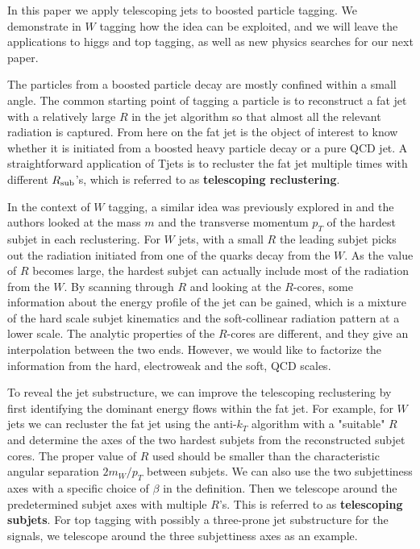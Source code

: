 \documentclass[aps,prl,floatfix,twocolumn,footinbib,amsmath,amssymb]{revtex4}
\begin{document}
In this paper we apply telescoping jets to boosted particle tagging. We demonstrate in $W$ tagging how the idea can be exploited, and we will leave the applications to higgs and top tagging, as well as new physics searches for our next paper.

The particles from a boosted particle decay are mostly confined within a small angle. The common starting point of tagging a particle is to reconstruct a fat jet with a relatively large $R$ in the jet algorithm so that almost all the relevant radiation is captured. From here on the fat jet is the object of interest to know whether it is initiated from a boosted heavy particle decay or a pure QCD jet. A straightforward application of Tjets is to recluster the fat jet multiple times with different $R_{\rm sub}$'s, which is referred to as {\bf telescoping reclustering}.

In the context of $W$ tagging, a similar idea was previously explored in \cite{Cui:2010km} and the authors looked at the mass $m$ and the transverse momentum $p_T$ of the hardest subjet in each reclustering. For $W$ jets, with a small $R$ the leading subjet picks out the radiation initiated from one of the quarks decay from the $W$. As the value of $R$ becomes large, the hardest subjet can actually include most of the radiation from the $W$. By scanning through $R$ and looking at the $R$-cores, some information about the energy profile of the jet can be gained, which is a mixture of the hard scale subjet kinematics and the soft-collinear radiation pattern at a lower scale. The analytic properties of the $R$-cores are different, and they give an interpolation between the two ends. However, we would like to factorize the information from the hard, electroweak and the soft, QCD scales.

To reveal the jet substructure, we can improve the telescoping reclustering by first identifying the dominant energy flows within the fat jet. For example, for $W$ jets we can recluster the fat jet using the anti-$k_T$ algorithm with a "suitable" $R$ and determine the axes of the two hardest subjets from the reconstructed subjet cores. The proper value of $R$ used should be smaller than the characteristic angular separation $2 m_W/p_T$ between subjets. We can also use the two subjettiness axes with a specific choice of $\beta$ in the definition. Then we telescope around the predetermined subjet axes with multiple $R$'s. This is referred to as {\bf telescoping subjets}. For top tagging with possibly a three-prone jet substructure for the signals, we telescope around the three subjettiness axes as an example. 
\end{document}
